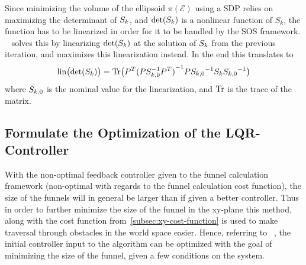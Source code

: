 Since minimizing the volume of the ellipsoid \(\pi(\mathcal{E})\) using a
\ac{SDP} relies on maximizing the determinant of \(S_k\), and \(\operatorname{det}(
S_k)\) is a nonlinear function of \(S_k\), the function has to be
linearized in order for it to be handled by the \ac{SOS} framework.
\citeauthor{majumdarFunnelLibrariesRealtime2017}~\cite{majumdarFunnelLibrariesRealtime2017}
solves this by linearizing \(\operatorname{det}(S_k)\) at the solution of \(S_k\)
from the previous iteration, and maximizes this linearization instead. In the
end this translates to
\[
  \operatorname{lin} \bigl( \operatorname{det} \lparen S_k\rparen \bigr) = \operatorname{Tr} \bigl( P^{T}{\lparen P
      S_{k,0}^{-1} P^T\rparen}^{-1} P {S_{k,0}}^{-1}
    S_k {S_{k,0}}^{-1} \bigr)
\]
where \( S_{k,0}\) is the nominal value for the linearization, and \(\operatorname{Tr}\)
is the trace of the matrix.

\subsection{Formulate the Optimization of the \ac{LQR}-Controller}
\label{subsec:searching-for-a-controller}

With the non-optimal feedback controller given to the funnel calculation
framework (non-optimal with regards to the funnel calculation cost function),
the size of the funnels will in general be larger than if given a better
controller. Thus in order to further minimize the size of the funnel in the
xy-plane this method, along with the cost function
from~\cref{subsec:xy-cost-function} is used to make traversal through obstacles
in the world space easier. Hence, referring to
\citeauthor{majumdarFunnelLibrariesRealtime2017}~\cite[sec~4.3.2]{majumdarFunnelLibrariesRealtime2017},
the initial controller input to the algorithm can be optimized with the goal of
minimizing the size of the funnel, given a few conditions on the system.

